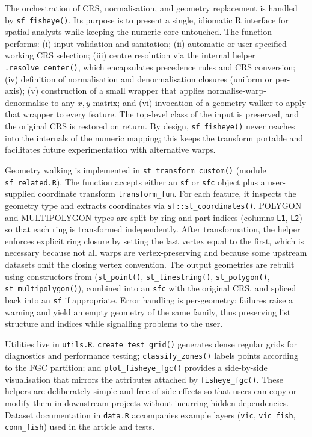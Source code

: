 The orchestration of CRS, normalisation, and geometry replacement is handled by \texttt{sf\_fisheye()}.
Its purpose is to present a single, idiomatic R interface for spatial analysts while keeping the
numeric core untouched. The function performs: (i) input validation and sanitation; (ii) automatic or
user-specified working CRS selection; (iii) centre resolution via the internal helper
\texttt{.resolve\_center()}, which encapsulates precedence rules and CRS conversion; (iv) definition of
normalisation and denormalisation closures (uniform or per-axis); (v) construction of a small
wrapper that applies normalise-warp-denormalise to any \(x,y\) matrix; and (vi) invocation of a
geometry walker to apply that wrapper to every feature. The top-level class of the input is
preserved, and the original CRS is restored on return. By design, \texttt{sf\_fisheye()} never reaches
into the internals of the numeric mapping; this keeps the transform portable and facilitates future
experimentation with alternative warps.

Geometry walking is implemented in \texttt{st\_transform\_custom()} (module \texttt{sf\_related.R}). The
function accepts either an \texttt{sf} or \texttt{sfc} object plus a user-supplied coordinate transform
\texttt{transform\_fun}. For each feature, it inspects the geometry type and extracts coordinates via
\texttt{sf::st\_coordinates()}. POLYGON and MULTIPOLYGON types are split by ring and part indices
(columns \texttt{L1}, \texttt{L2}) so that each ring is transformed independently. After transformation,
the helper enforces explicit ring closure by setting the last vertex equal to the first, which is
necessary because not all warps are vertex-preserving and because some upstream datasets omit the
closing vertex convention. The output geometries are rebuilt using constructors from 
(\texttt{st\_point()}, \texttt{st\_linestring()}, \texttt{st\_polygon()}, \texttt{st\_multipolygon()}), combined
into an \texttt{sfc} with the original CRS, and spliced back into an \texttt{sf} if appropriate. Error
handling is per-geometry: failures raise a warning and yield an empty geometry of the same family,
thus preserving list structure and indices while signalling problems to the user.

Utilities live in \texttt{utils.R}. \texttt{create\_test\_grid()} generates dense regular grids for
diagnostics and performance testing; \texttt{classify\_zones()} labels points according to the FGC
partition; and \texttt{plot\_fisheye\_fgc()} provides a side-by-side visualisation that mirrors the
attributes attached by \texttt{fisheye\_fgc()}. These helpers are deliberately simple and free of
side-effects so that users can copy or modify them in downstream projects without incurring hidden
dependencies. Dataset documentation in \texttt{data.R} accompanies example layers (\texttt{vic},
\texttt{vic\_fish}, \texttt{conn\_fish}) used in the article and tests.

